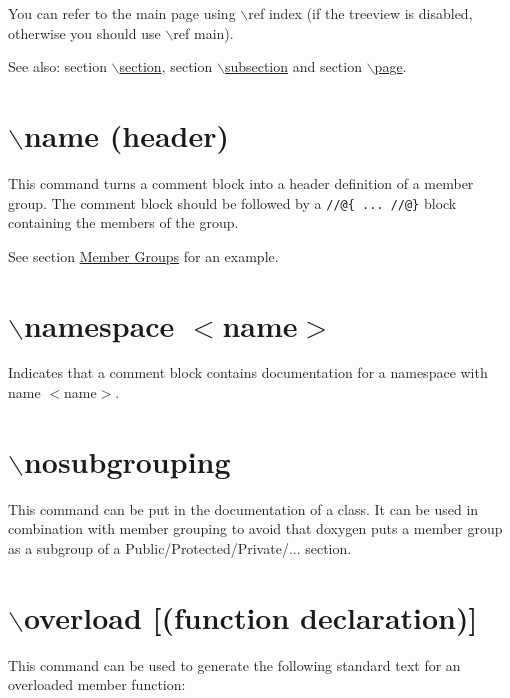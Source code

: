 You can refer to the main page using $\backslash$ref index (if the treeview is disabled, otherwise you should use $\backslash$ref main).

\begin{Desc}
\item[See also:]section \hyperlink{commands_cmdsection}{$\backslash$section}, section \hyperlink{commands_cmdsubsection}{$\backslash$subsection} and section \hyperlink{commands_cmdpage}{$\backslash$page}.\end{Desc}


 \hypertarget{commands_cmdname}{}\section{$\backslash$name (header)}\label{commands_cmdname}
This command turns a comment block into a header definition of a member group. The comment block should be followed by a {\tt //@\{ ... //@\}} block containing the members of the group.

See section \hyperlink{grouping_memgroup}{Member Groups} for an example.



 \hypertarget{commands_cmdnamespace}{}\section{$\backslash$namespace $<$name$>$}\label{commands_cmdnamespace}
 Indicates that a comment block contains documentation for a namespace with name $<$name$>$.



 \hypertarget{commands_cmdnosubgrouping}{}\section{$\backslash$nosubgrouping}\label{commands_cmdnosubgrouping}
 This command can be put in the documentation of a class. It can be used in combination with member grouping to avoid that doxygen puts a member group as a subgroup of a Public/Protected/Private/... section.



 \hypertarget{commands_cmdoverload}{}\section{$\backslash$overload \mbox{[}(function declaration)\mbox{]}}\label{commands_cmdoverload}
 This command can be used to generate the following standard text for an overloaded member function:

